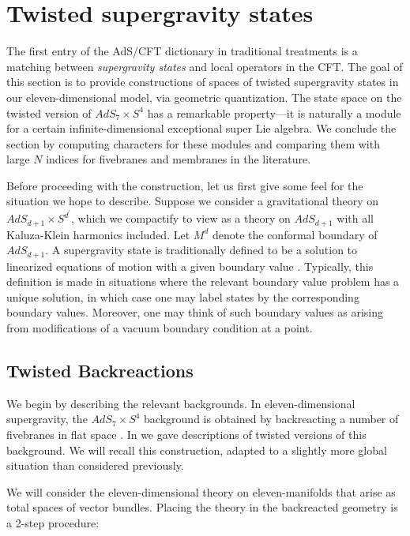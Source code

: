 %
%
%

\section{Twisted supergravity states}
\label{sec:states}

The first entry of the AdS/CFT dictionary in traditional treatments is a matching between \textit{supergravity states} and local operators in the CFT.
The goal of this section is to provide constructions of spaces of twisted supergravity states in our eleven-dimensional model, via geometric quantization. 
The state space on the twisted version of $AdS_{7}\times S^{4}$ has a remarkable property---it is naturally a module for a certain infinite-dimensional exceptional super Lie algebra. 
We conclude the section by computing characters for these modules and comparing them with large $N$ indices for fivebranes and membranes in the literature.

Before proceeding with the construction, let us first give some feel for the situation we hope to describe.
Suppose we consider a gravitational theory on $AdS_{d+1}\times S^{d^{\prime}}$, which we compactify to view as a theory on $AdS_{d+1}$ with all Kaluza-Klein harmonics included. Let $M^{d}$ denote the conformal boundary of $AdS_{d+1}$. A supergravity state is traditionally defined to be a solution to linearized equations of motion with a given boundary value \cite{WittenAdS}. 
Typically, this definition is made in situations where the relevant boundary value problem has a unique solution, in which case one may label states by the corresponding boundary values. Moreover, one may think of such boundary values as arising from modifications of a vacuum boundary condition at a point.


\subsection{Twisted Backreactions}
We begin by describing the relevant backgrounds. In eleven-dimensional supergravity, the $AdS_7 \times S^4$ background is obtained by backreacting a number of fivebranes in flat space \cite{Maldacena:1997re,WittenAdS}.
In \cite{RSW} we gave descriptions of twisted versions of this background. We will recall this construction, adapted to a slightly more global situation than considered previously.

We will consider the eleven-dimensional theory on eleven-manifolds that arise as total spaces of vector bundles. Placing the theory in the backreacted geometry is a 2-step procedure:

